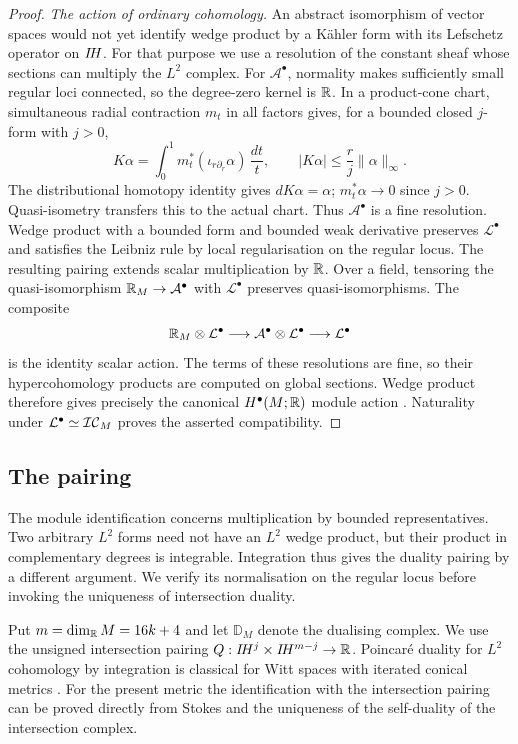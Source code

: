 \begin{proof}
\emph{The action of ordinary cohomology.}
An abstract isomorphism of vector spaces would not yet identify
wedge product by a K\"ahler form with its Lefschetz operator on
$I\!H$. For that purpose we use a resolution of the constant
sheaf whose sections can multiply the $L^2$ complex.
For $\mathcal A^\bullet$, normality makes sufficiently small
regular loci connected, so the degree-zero kernel is $\mathbb R$.
In a product-cone chart, simultaneous radial contraction $m_t$
in all factors gives, for a bounded closed $j$-form with $j>0$,
\[
 K\alpha=\int_0^1m_t^*(\iota_{r\partial_r}\alpha)\,\frac{dt}{t},
 \qquad |K\alpha|\le\frac rj\|\alpha\|_\infty.
\]
The distributional homotopy identity gives $dK\alpha=\alpha$;
$m_t^*\alpha\to0$ since $j>0$. Quasi-isometry transfers this
to the actual chart. Thus $\mathcal A^\bullet$ is a fine
resolution. Wedge product with a bounded form and bounded weak
derivative preserves $\mathcal L^\bullet$ and satisfies the
Leibniz rule by local regularisation on the regular locus.
The resulting pairing extends scalar multiplication by $\mathbb R$.
Over a field, tensoring the quasi-isomorphism
$\mathbb R_M\to\mathcal A^\bullet$ with
$\mathcal L^\bullet$ preserves quasi-isomorphisms. The composite
\[
 \mathbb R_M\otimes\mathcal L^\bullet
 \longrightarrow\mathcal A^\bullet\otimes\mathcal L^\bullet
 \longrightarrow\mathcal L^\bullet
\]
is the identity scalar action. The terms of these resolutions are
fine, so their hypercohomology products are computed on global
sections. Wedge product therefore gives precisely the canonical
$H^\bullet(M;\mathbb R)$ module action \cite[II.7]{bredon97}.
Naturality under $\mathcal L^\bullet\simeq\mathcal{IC}_M$ proves
the asserted compatibility.
\end{proof}

\subsection{The pairing}
The module identification concerns multiplication by bounded
representatives. Two arbitrary $L^2$ forms need not have an
$L^2$ wedge product, but their product in complementary degrees
is integrable. Integration thus gives the duality pairing by a
different argument. We verify its normalisation on the regular
locus before invoking the uniqueness of intersection duality.

Put $m=\dim_{\mathbb R}M=16k+4$ and let $\mathbb D_M$ denote the
dualising complex. We use the unsigned intersection pairing
$Q:I\!H^j\times I\!H^{m-j}\to\mathbb R$. Poincar\'e duality for
$L^2$ cohomology by integration is classical for Witt spaces
with iterated conical metrics \cite{cheeger83b,almp18}.
For the present metric the identification with the intersection
pairing can be proved directly from Stokes and the uniqueness
of the self-duality of the intersection complex.

